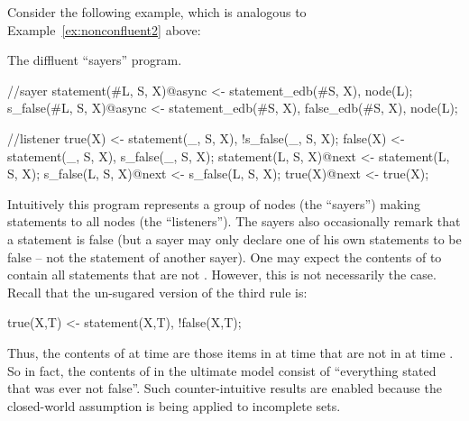 Consider the following example, which is analogous to Example~\ref{ex:nonconfluent2} above:

\begin{example}
\label{ex:sayers}
The diffluent ``sayers'' program.

\begin{Dedalus}
//sayer
statement(#L, S, X)@async <- statement_edb(#S, X),
                             node(L);
s_false(#L, S, X)@async <- statement_edb(#S, X),
                           false_edb(#S, X),
                           node(L);

//listener
true(X) <- statement(_, S, X), !s_false(_, S, X);
false(X) <- statement(_, S, X), s_false(_, S, X);
statement(L, S, X)@next <- statement(L, S, X);
s_false(L, S, X)@next <- s_false(L, S, X);
true(X)@next <- true(X);
\end{Dedalus}
\end{example}

Intuitively this program represents a group of nodes (the ``sayers'') making statements to all nodes (the ``listeners'').  The sayers also occasionally remark that a statement is false (but a sayer may only declare one of his own statements to be false -- not the statement of another sayer).  One may expect the contents of  to contain all statements that are not .  However, this is not necessarily the case.  Recall that the un-sugared version of the third rule is:

\begin{Dedalus}
true(X,T) <- statement(X,T), !false(X,T);
\end{Dedalus}

\noindent
Thus, the contents of  at time  are those items in  at time  that are not in  at time .  So in fact, the contents of  in the ultimate model consist of ``everything stated that was ever not false''.  Such counter-intuitive results are enabled because the closed-world assumption is being applied to incomplete sets.

